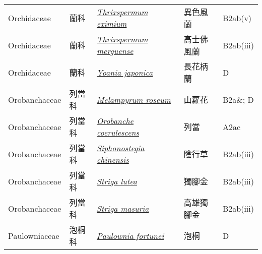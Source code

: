 {\begin{longtable}{L{2.5cm}L{2cm}L{5cm}L{2.5cm}L{3cm}}
    Orchidaceae & 蘭科 & \href{http://www.theplantlist.org/tpl1.1/search?q=Thrixspermum+eximium}{\textit{Thrixspermum eximium} } & 異色風蘭 & B2ab(v)    \\
    Orchidaceae & 蘭科 & \href{http://www.theplantlist.org/tpl1.1/search?q=Thrixspermum+merguense}{\textit{Thrixspermum merguense} } & 高士佛風蘭 & B2ab(iii)    \\
    Orchidaceae & 蘭科 & \href{http://www.theplantlist.org/tpl1.1/search?q=Yoania+japonica}{\textit{Yoania japonica} } & 長花柄蘭 & D    \\
    Orobanchaceae & 列當科 & \href{http://www.theplantlist.org/tpl1.1/search?q=Melampyrum+roseum}{\textit{Melampyrum roseum} } & 山蘿花 & B2a\&; D    \\
    Orobanchaceae & 列當科 & \href{http://www.theplantlist.org/tpl1.1/search?q=Orobanche+coerulescens}{\textit{Orobanche coerulescens} } & 列當 & A2ac    \\
    Orobanchaceae & 列當科 & \href{http://www.theplantlist.org/tpl1.1/search?q=Siphonostegia+chinensis}{\textit{Siphonostegia chinensis} } & 陰行草 & B2ab(iii)    \\
    Orobanchaceae & 列當科 & \href{http://www.theplantlist.org/tpl1.1/search?q=Striga+lutea}{\textit{Striga lutea} } & 獨腳金 & B2ab(iii)    \\
    Orobanchaceae & 列當科 & \href{http://www.theplantlist.org/tpl1.1/search?q=Striga+masuria}{\textit{Striga masuria} } & 高雄獨腳金 & B2ab(iii)    \\
    Paulowniaceae & 泡桐科 & \href{http://www.theplantlist.org/tpl1.1/search?q=Paulownia+fortunei}{\textit{Paulownia fortunei} } & 泡桐 & D    \\

\end{longtable}}
